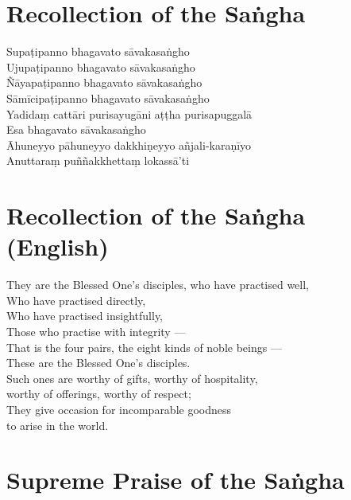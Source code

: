\section*{Recollection of the Saṅgha}

\begin{leader}
\end{leader}

Supaṭipanno bhagavato sāvakasaṅgho\\
Ujupaṭipanno bhagavato sāvakasaṅgho\\
Ñāyapaṭipanno bhagavato sāvakasaṅgho\\
Sāmīcipaṭipanno bhagavato sāvakasaṅgho\\
Yadidaṃ cattāri purisayugāni aṭṭha purisapuggalā\\
Esa bhagavato sāvakasaṅgho\\
Āhuneyyo pāhuneyyo dakkhiṇeyyo añjali-karaṇīyo\\
Anuttaraṃ puññakkhettaṃ lokassā'ti

\section*{Recollection of the Saṅgha (English)}

\begin{leader}
\end{leader}

They are the Blessed One's disciples, who have practised well,\\
Who have practised directly,\\
Who have practised insightfully,\\
Those who practise with integrity ---\\
That is the four pairs, the eight kinds of noble beings ---\\
These are the Blessed One's disciples.\\
Such ones are worthy of gifts, worthy of hospitality,\\
\vin worthy of offerings, worthy of respect;\\
They give occasion for incomparable goodness\\\vin to arise in the world.

\section*{Supreme Praise of the Saṅgha}

